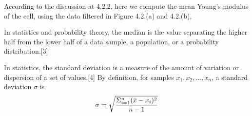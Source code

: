 \documentclass[a4paper,english,12pt,bibliography=totoc]{scrreprt}
\begin{document}
According to the discussion at 4.2.2, here we compute the mean Young's modulus of the cell, using the data filtered in Figure 4.2.(a) and 4.2.(b),


In statistics and probability theory, the median is the value separating the higher half from the lower half of a data sample, a population, or a probability distribution.[3]

In statistics, the standard deviation is a measure of the amount of variation or dispersion of a set of values.[4] By definition, for samples \(x_1, x_2, \ldots, x_n\), a standard deviation \(\sigma\) is
\[ \sigma = \sqrt{\frac{\Sigma^n_{i=1}(\Bar{x} - x_i)^{2}}{n-1}}
\]


\end{document}

